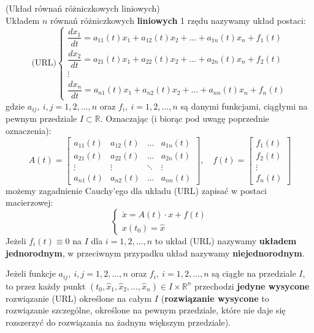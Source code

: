 \begin{df}{(Układ równań różniczkowych liniowych)}\\
Układem $n$ równań różniczkowych \textbf{liniowych} 1 rzędu nazywamy układ postaci:
$$\textrm{(URL)}
\left\{\begin{array}{c}
\dfrac{dx_1}{dt}=a_{11}(t)x_1+a_{12}(t)x_2+\ldots+a_{1n}(t)x_n+f_1(t)\\
\dfrac{dx_2}{dt}=a_{21}(t)x_1+a_{22}(t)x_2+\ldots+a_{2n}(t)x_n+f_2(t)\\
\vdots\\
\dfrac{dx_n}{dt}=a_{n1}(t)x_1+a_{n2}(t)x_2+\ldots+a_{nn}(t)x_n+f_n(t)
\end{array}\right.$$
gdzie $a_{ij},\ i,j=1,2,\ldots,n$ oraz $f_i,\ i=1,2,\ldots,n$ są danymi funkcjami, ciągłymi na pewnym przedziale $I\subset\mathbb{R}$. Oznaczając (i biorąc pod uwagę poprzednie oznaczenia):
$$A(t)=
\begin{bmatrix}
a_{11}(t) & a_{12}(t) & \ldots & a_{1n}(t)\\
a_{21}(t) & a_{22}(t) & \ldots & a_{2n}(t)\\
\vdots & \vdots & \ddots & \vdots\\
a_{n1}(t) & a_{n2}(t) & \ldots & a_{nn}(t)
\end{bmatrix},\quad f(t)=
\begin{bmatrix}
f_1(t)\\
f_2(t)\\
\vdots\\
f_n(t)
\end{bmatrix}$$
możemy zagadnienie Cauchy'ego dla układu (URL) zapisać w postaci macierzowej:
$$\left\{\begin{array}{l}
\dot{x}=A(t)\cdot x+f(t)\\
x(t_0)=\hat{x}
\end{array}\right.$$
Jeżeli $f_i(t)\equiv 0$ na $I$ dla $i=1,2,\ldots,n$ to układ (URL) nazywamy \textbf{układem jednorodnym}, w przeciwnym przypadku układ nazywamy \textbf{niejednorodnym}.
\end{df}

\begin{tw}
Jeżeli funkcje $a_{ij},\ i,j=1,2,\ldots,n$ oraz $f_i,\ i=1,2,\ldots,n$ są ciągłe na przedziale $I$, to przez każdy punkt $(t_0,\hat{x}_1,\hat{x}_2,\ldots,\hat{x}_n)\in I\times\mathbb{R}^n$ przechodzi \textbf{jedyne wysycone} rozwiązanie (URL) określone na całym $I$ (\textbf{rozwiązanie wysycone} to rozwiązanie szczególne, określone na pewnym przedziale, które nie daje się rozszerzyć do rozwiązania na żadnym większym przedziale).
\end{tw}

